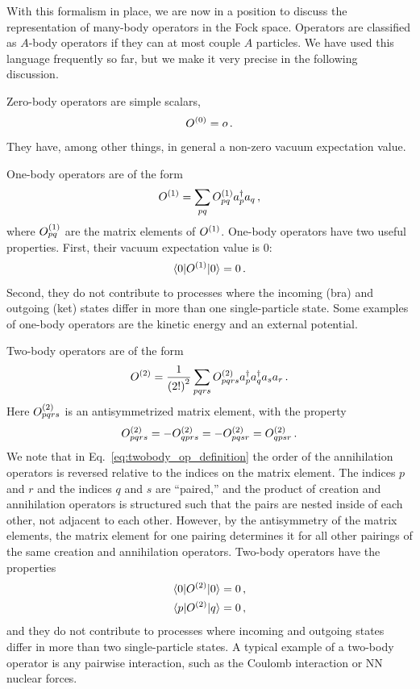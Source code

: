 With this formalism in place,
we are now in a position to discuss the representation of many-body operators
in the Fock space.
Operators are classified as $A$-body operators if they can at most couple $A$ particles.
We have used this language frequently so far,
but we make it very precise in the following discussion.

Zero-body operators are simple scalars,
\begin{equation}
  {O}^{(0)} = o\,.
\end{equation}
They have, among other things, in general a non-zero vacuum expectation value.

One-body operators are of the form
\begin{equation}\label{eq:onebody_op_definition}
  {O}^{(1)} = \sum_{pq} {O}^{(1)}_{pq} a_{p}^{\dagger} a_{q}\,,
\end{equation}
where ${O}^{(1)}_{pq}$ are the matrix elements of ${O}^{(1)}$.
One-body operators have two useful properties.
First, their vacuum expectation value is 0:
\begin{equation}
  \braket{0 | {O}^{(1)} | 0} = 0\,.
\end{equation}
Second, they do not contribute to processes
where the incoming (bra) and outgoing (ket) states differ
in more than one single-particle state.
Some examples of one-body operators are the kinetic energy and an external potential.

Two-body operators are of the form
\begin{equation}
  {O}^{(2)} = \frac{1}{{(2!)}^2} \sum_{pqrs} {O}^{(2)}_{pqrs} a_{p}^{\dagger} a_{q}^{\dagger} a_{s} a_{r}\,.\label{eq:twobody_op_definition}
\end{equation}
Here ${O}^{(2)}_{pqrs}$ is an antisymmetrized matrix element, with the property
\begin{equation}
  {O}^{(2)}_{pqrs} = - {O}^{(2)}_{qprs} = - {O}^{(2)}_{pqsr} = {O}^{(2)}_{qpsr}\,.
\end{equation}
We note that in Eq.~\eqref{eq:twobody_op_definition}
the order of the annihilation operators is reversed
relative to the indices on the matrix element.
The indices $p$ and $r$ and the indices $q$ and $s$ are ``paired,''
and the product of creation and annihilation operators is structured
such that the pairs are nested inside of each other,
not adjacent to each other.
However, by the antisymmetry of the matrix elements,
the matrix element for one pairing determines it
for all other pairings of the same creation and annihilation operators.
Two-body operators have the properties
\begin{align}
  \braket{0 | {O}^{(2)} | 0} & = 0\,, \\
  \braket{p | {O}^{(2)} | q} & = 0\,,
\end{align}
and they do not contribute to processes where incoming and outgoing states
differ in more than two single-particle states.
A typical example of a two-body operator is any pairwise interaction,
such as the Coulomb interaction or NN nuclear forces.

